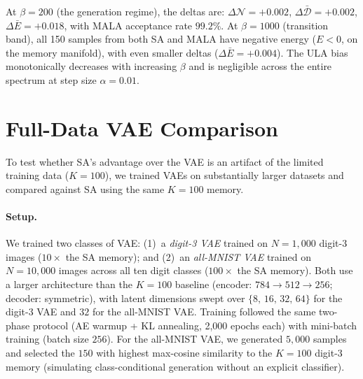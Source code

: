 At $\beta{=}200$ (the generation regime), the deltas are: $\Delta\mathcal{N}{=}+0.002$, $\Delta\bar{\mathcal{D}}{=}+0.002$, $\Delta\bar{E}{=}+0.018$, with MALA acceptance rate $99.2\%$. At $\beta{=}1000$ (transition band), all 150 samples from both SA and MALA have negative energy ($E<0$, on the memory manifold), with even smaller deltas ($\Delta\bar{E}{=}+0.004$). The ULA bias monotonically decreases with increasing $\beta$ and is negligible across the entire spectrum at step size $\alpha{=}0.01$.

\section{Full-Data VAE Comparison}\label{app:full-mnist-vae}

To test whether SA's advantage over the VAE is an artifact of the limited training data ($K{=}100$), we trained VAEs on substantially larger datasets and compared against SA using the same $K{=}100$ memory.

\paragraph{Setup.}
We trained two classes of VAE: (1)~a \emph{digit-3 VAE} trained on $N{=}1{,}000$ digit-3 images (${10\times}$ the SA memory); and (2)~an \emph{all-MNIST VAE} trained on $N{=}10{,}000$ images across all ten digit classes (${100\times}$ the SA memory). Both use a larger architecture than the $K{=}100$ baseline (encoder: $784\to 512\to 256$; decoder: symmetric), with latent dimensions swept over $\{8,\,16,\,32,\,64\}$ for the digit-3 VAE and $32$ for the all-MNIST VAE. Training followed the same two-phase protocol (AE warmup + KL annealing, 2{,}000 epochs each) with mini-batch training (batch size $256$). For the all-MNIST VAE, we generated $5{,}000$ samples and selected the $150$ with highest max-cosine similarity to the $K{=}100$ digit-3 memory (simulating class-conditional generation without an explicit classifier).

